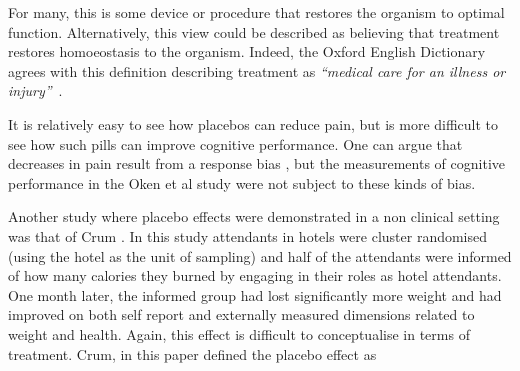 For many, this is some device or procedure that restores the organism to optimal function. Alternatively, this view could be described as believing that treatment restores homoeostasis to the organism. Indeed, the Oxford English Dictionary agrees with this definition describing treatment as \textit{``medical care for an illness or injury''}~\cite{dictionary20101989}.


It is relatively easy to see how placebos can reduce pain, but is more difficult to see how such pills can improve cognitive performance. One can argue that decreases in pain result from a response bias \cite{Allan2002}, but the measurements of cognitive performance in the Oken et al study were not subject to these kinds of bias. 




Another study where placebo effects were demonstrated in a non clinical setting was that of Crum \cite{Crum2007}. In this study attendants in hotels were cluster randomised (using the hotel as the unit of sampling) and half of the attendants were informed of how many calories they burned by engaging in their roles as hotel attendants. One month later, the informed group had lost significantly more weight and had improved on both self report and externally measured dimensions related to weight and health. Again, this effect is difficult to conceptualise in terms of treatment.  Crum, in this paper defined the placebo effect as

